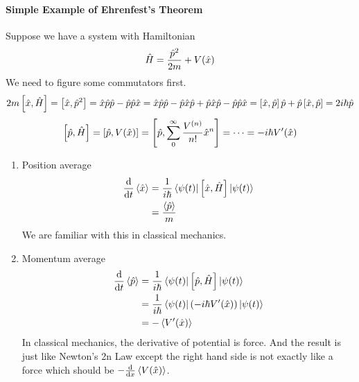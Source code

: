 \documentclass[letterpaper,10pt,english]{sphinxmanual}
\def\d{{\rm d}}
\newcommand{\bra}[1]{\left\langle #1\right|}
\newcommand{\ket}[1]{\left| #1\right\rangle}
\begin{document}
\paragraph{Simple Example of Ehrenfest's Theorem}
\label{Quantum/QuantumMechanics:simple-example-of-ehrenfest-s-theorem}
Suppose we have a system with Hamiltonian
\begin{gather}
\begin{split}\hat H = \frac{\hat p^2}{2m} + V(\hat x)\end{split}\notag
\end{gather}
We need to figure some commutators first.
\begin{gather}
\begin{split}2m \left[ \hat x, \hat H \right] =\left[\hat x, \hat p^2\right] = \hat x \hat p\hat p - \hat p \hat p \hat x = \hat x \hat p \hat p -\hat p \hat x \hat p + \hat p \hat x \hat p - \hat p \hat p \hat x  = \left[\hat x , \hat p\right]\hat p + \hat p \left[ \hat x,\hat p\right]  = 2 i \hbar \hat p\end{split}\notag
\end{gather}\begin{gather}
\begin{split}\left[\hat p, \hat H\right] = \left[\hat p, V(\hat x) \right] = \left[\hat p, \sum_0^\infty \frac{V^{(n)}}{n!}\hat x^n\right] =\cdots =-i\hbar V'(\hat x)\end{split}\notag
\end{gather}\begin{enumerate}
\item {} 
Position average
\begin{gather}
\begin{split}\frac{\d }{\d t} \left< \hat x \right> & =  \frac{1}{i\hbar} \bra{\psi(t)} \left[ \hat x, \hat H \right]\ket{\psi(t)} \\
& =   \frac{\left< \hat p \right>}{m}\end{split}\notag
\end{gather}
We are familiar with this in classical mechanics.

\item {} 
Momentum average
\begin{gather}
\begin{split}\frac{\d}{\d t} \left<\hat p\right> & =  \frac{1}{i\hbar} \bra{\psi(t)} \left[\hat p, \hat H\right] \ket{\psi(t)} \\
& =  \frac{1}{i\hbar} \bra{\psi(t)}  (-i\hbar V'(\hat x))  \ket{\psi(t)}  \\
& =  -\left< V'(\hat x) \right>\end{split}\notag
\end{gather}
In classical mechanics, the derivative of potential is force. And the result is just like Newton's 2n Law except the right hand side is not exactly like a force which should be \(-\frac{\d}{\d x} \left< V(\hat x) \right>\).

\end{enumerate}
\end{document}
